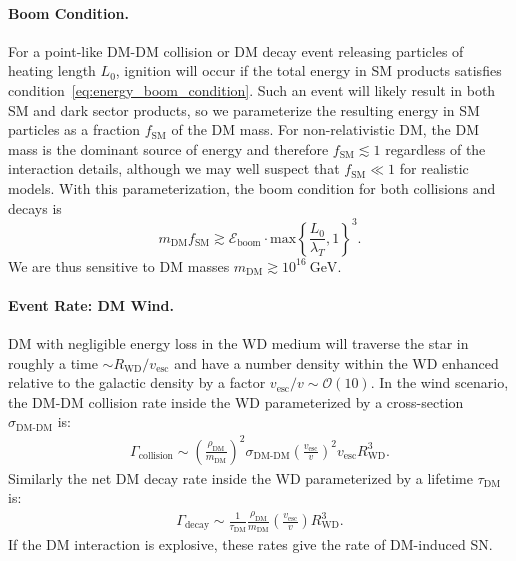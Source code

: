 \documentclass[twocolumn, preprintnumbers,amsmath,amssymb,prd, superscriptaddress]{revtex4}
\newcommand{\Eboom}{\mathcal{E}_\text{boom}}
\newcommand{\OO}{\mathcal{O}}
\newcommand{\GeV}{\text{GeV}}
\def\r{\right)}
\def\l{\left(}
\begin{document}
\paragraph{Boom Condition.}
For a point-like DM-DM collision or DM decay event releasing particles of heating length $L_0$, ignition will occur if the total energy in SM products satisfies condition~\eqref{eq:energy_boom_condition}.
Such an event will likely result in both SM and dark sector products, so we parameterize the resulting energy in SM particles as a fraction $f_\text{SM}$ of the DM mass.
For non-relativistic DM, the DM mass is the dominant source of energy and therefore $f_\text{SM} \lesssim 1$ regardless of the interaction details, although we may well suspect that $f_\text{SM} \ll 1$ for realistic models.
With this parameterization, the boom condition for both collisions and decays is
\begin{equation}
\label{eq:coldecay}
  m_\text{DM} f_\text{SM}  \gtrsim \Eboom \cdot \text{max} \left \{\frac{L_0}{\lambda_T}, 1 \right \}^3.
\end{equation}
We are thus sensitive to DM masses $m_\text{DM} \gtrsim 10^{16} ~\GeV$.

\paragraph{Event Rate: DM Wind.}
DM with negligible energy loss in the WD medium will traverse the star in roughly a time $\sim R_\text{WD}/v_\text{esc}$ and have a number density within the WD enhanced relative to the galactic density by a factor $v_\text{esc}/v \sim \OO(10)$.
In the wind scenario, the DM-DM collision rate inside the WD parameterized by a cross-section $\sigma_\text{DM-DM}$ is:
\begin{align}
  \Gamma_\text{collision}
  \sim \l \frac{\rho_\text{DM}}{m_\text{DM}} \r^2 \sigma_\text{DM-DM} \l \frac{v_\text{esc}}{v}\r^2 v_\text{esc} R_\text{WD}^3. 
  \label{eq:collisionDM}
\end{align}
Similarly the net DM decay rate inside the WD parameterized by a lifetime $\tau_\text{DM}$ is:
\begin{align}
 \Gamma_\text{decay}
  \sim \frac{1}{\tau_\text{DM}} \frac{\rho_{\text{DM}}}{m_\text{DM}} \l \frac{v_\text{esc}}{v}\r R_\text{WD}^3.
  \label{eq:taugamma}
\end{align}
If the DM interaction is explosive, these rates give the rate of DM-induced SN.
\end{document}
